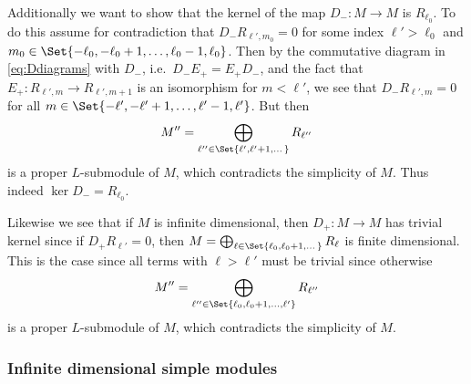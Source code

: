 Additionally we want to show that the kernel of the map $D_-\colon M\to M$ is $R_{\ell_0}$. To do this assume for contradiction that $D_-R_{\ell',m_0}=0$ for some index $\ell'>\ell_0$ and $m_0\in\Set{-\ell_0,-\ell_0+1,\dotsc,\ell_0-1,\ell_0}$. Then by the commutative diagram in \cref{eq:Ddiagrams} with $D_-$, i.e.\ $D_-E_+=E_+D_-$, and the fact that $E_+\colon R_{\ell',m}\to R_{\ell',m+1}$ is an isomorphism for $m<\ell'$, we see that $D_-R_{\ell',m}=0$ for all $m\in\Set{-\ell',-\ell'+1,\dotsc,\ell'-1,\ell'}$. But then
\begin{align*}
  M'' = \bigoplus_{\ell''\in\Set{\ell',\ell'+1,\dotsc}} R_{\ell''}
\end{align*}
is a proper $L$-submodule of $M$, which contradicts the simplicity of $M$. Thus indeed $\ker D_- = R_{\ell_0}$.

Likewise we see that if $M$ is infinite dimensional, then $D_+\colon M\to M$ has trivial kernel since if $D_+R_{\ell'}=0$, then $M=\bigoplus_{\ell\in\Set{\ell_0,\ell_0+1,\dotsc}} R_{\ell}$ is finite dimensional. This is the case since all terms with $\ell>\ell'$ must be trivial since otherwise
\begin{align*}
  M'' = \bigoplus_{\ell''\in\Set{\ell_0,\ell_0+1,\dotsc,\ell'}} R_{\ell''}
\end{align*}
is a proper $L$-submodule of $M$, which contradicts the simplicity of $M$.

\subsubsection{Infinite dimensional simple modules}


